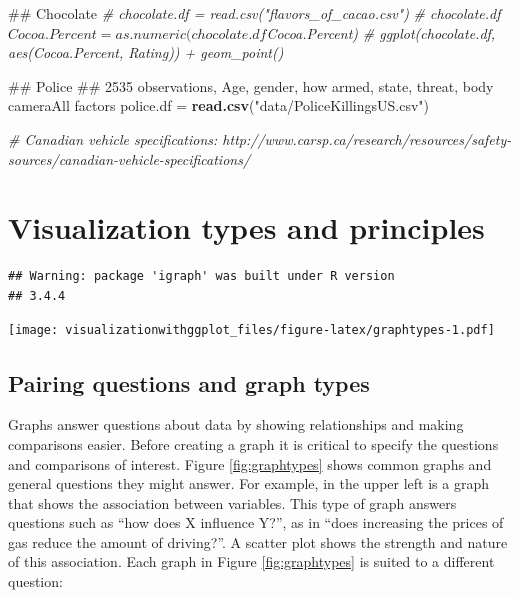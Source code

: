 \documentclass[]{krantz}
\makeatletter
\newenvironment{Shaded}{\begin{snugshade}}{\end{snugshade}}
\newcommand{\KeywordTok}[1]{\textcolor[rgb]{0.13,0.29,0.53}{\textbf{#1}}}
\newcommand{\StringTok}[1]{\textcolor[rgb]{0.31,0.60,0.02}{#1}}
\newcommand{\CommentTok}[1]{\textcolor[rgb]{0.56,0.35,0.01}{\textit{#1}}}
\newcommand{\NormalTok}[1]{#1}
\newenvironment{kframe}{%
\medskip{}
\setlength{\fboxsep}{.8em}
 \def\at@end@of@kframe{}%
 \ifinner\ifhmode%
  \def\at@end@of@kframe{\end{minipage}}%
  \begin{minipage}{\columnwidth}%
 \fi\fi%
 \def\FrameCommand##1{\hskip\@totalleftmargin \hskip-\fboxsep
 \colorbox{shadecolor}{##1}\hskip-\fboxsep
     \hskip-\linewidth \hskip-\@totalleftmargin \hskip\columnwidth}%
 \MakeFramed {\advance\hsize-\width
   \@totalleftmargin\z@ \linewidth\hsize
   \@setminipage}}%
 {\par\unskip\endMakeFramed%
 \at@end@of@kframe}
\renewenvironment{Shaded}{\begin{kframe}}{\end{kframe}}
\theoremstyle{definition}
\theoremstyle{definition}
\theoremstyle{definition}
\theoremstyle{remark}
\makeatother
\begin{document}
\begin{Shaded}
\begin{Highlighting}[]
\NormalTok{## Chocolate}
\CommentTok{# chocolate.df = read.csv("flavors_of_cacao.csv")}
\CommentTok{# chocolate.df$Cocoa.Percent = as.numeric(chocolate.df$Cocoa.Percent)}
\CommentTok{# ggplot(chocolate.df, aes(Cocoa.Percent, Rating)) + geom_point()}


\NormalTok{## Police}
\NormalTok{## 2535 observations, Age, gender, how armed, state, threat, body cameraAll factors}
\NormalTok{ police.df =}\StringTok{ }\KeywordTok{read.csv}\NormalTok{(}\StringTok{"data/PoliceKillingsUS.csv"}\NormalTok{) }

\CommentTok{# Canadian vehicle specifications: http://www.carsp.ca/research/resources/safety-sources/canadian-vehicle-specifications/}
\end{Highlighting}
\end{Shaded}

\cleardoublepage 

\chapter{Visualization types and principles}\label{Principles}

\begin{verbatim}
## Warning: package 'igraph' was built under R version
## 3.4.4
\end{verbatim}

\texttt{[image: visualizationwithggplot\_files/figure-latex/graphtypes-1.pdf]}

\section{Pairing questions and graph
types}\label{pairing-questions-and-graph-types}

Graphs answer questions about data by showing relationships and making
comparisons easier. Before creating a graph it is critical to specify
the questions and comparisons of interest. Figure \ref{fig:graphtypes}
shows common graphs and general questions they might answer. For
example, in the upper left is a graph that shows the association between
variables. This type of graph answers questions such as ``how does X
influence Y?'', as in ``does increasing the prices of gas reduce the
amount of driving?''. A scatter plot shows the strength and nature of
this association. Each graph in Figure \ref{fig:graphtypes} is suited to
a different question:
\end{document}
